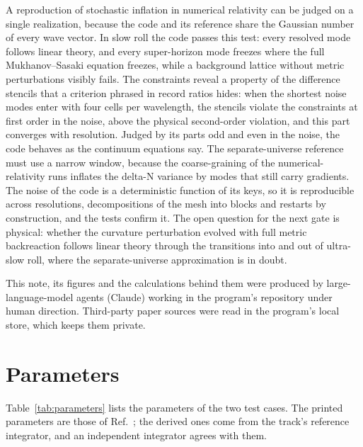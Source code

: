\documentclass[aps,prd,twocolumn,10pt,superscriptaddress,nofootinbib,longbibliography,floatfix]{revtex4-2}
\begin{document}
A reproduction of stochastic inflation in numerical relativity can be judged on a single realization, because the code and its reference share the Gaussian number of every wave vector. In slow roll the code passes this test: every resolved mode follows linear theory, and every super-horizon mode freezes where the full Mukhanov--Sasaki equation freezes, while a background lattice without metric perturbations visibly fails. The constraints reveal a property of the difference stencils that a criterion phrased in record ratios hides: when the shortest noise modes enter with four cells per wavelength, the stencils violate the constraints at first order in the noise, above the physical second-order violation, and this part converges with resolution. Judged by its parts odd and even in the noise, the code behaves as the continuum equations say. The separate-universe reference must use a narrow window, because the coarse-graining of the numerical-relativity runs inflates the delta-N variance by modes that still carry gradients. The noise of the code is a deterministic function of its keys, so it is reproducible across resolutions, decompositions of the mesh into blocks and restarts by construction, and the tests confirm it. The open question for the next gate is physical: whether the curvature perturbation evolved with full metric backreaction follows linear theory through the transitions into and out of ultra-slow roll, where the separate-universe approximation is in doubt.

\begin{acknowledgments}
This note, its figures and the calculations behind them were produced by large-language-model agents (Claude) working in the program's repository under human direction. Third-party paper sources were read in the program's local store, which keeps them private.
\end{acknowledgments}

\appendix

\section{Parameters}\label{app:parameters}

Table~\ref{tab:parameters} lists the parameters of the two test cases. The printed parameters are those of Ref.~\cite{Launay:2025sinr}; the derived ones come from the track's reference integrator, and an independent integrator agrees with them.


\end{document}
